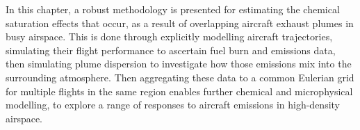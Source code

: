 In this chapter, a robust methodology is presented for estimating the chemical saturation effects that occur, as a result of overlapping aircraft exhaust plumes in busy airspace. This is done through explicitly modelling aircraft trajectories, simulating their flight performance to ascertain fuel burn and emissions data, then simulating plume dispersion to investigate how those emissions mix into the surrounding atmosphere. Then aggregating these data to a common Eulerian grid for multiple flights in the same region enables further chemical and microphysical modelling, to explore a range of responses to aircraft emissions in high-density airspace.











